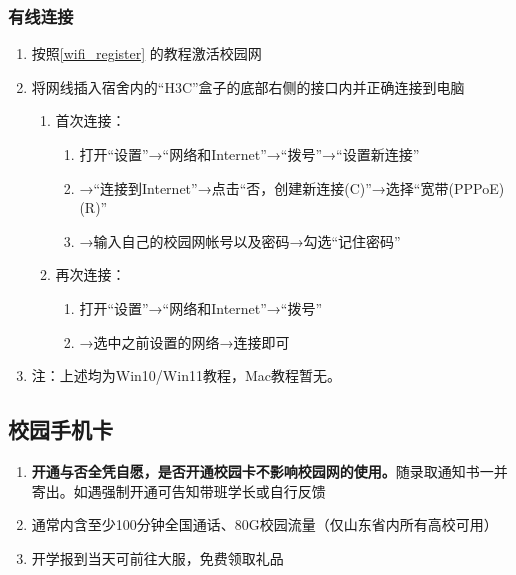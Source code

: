 \subsubsection[有线连接]{有线连接}
\begin{enumerate}
    \item 按照\uline{\ref{wifi_register}} 的教程激活校园网
    \item 将网线插入宿舍内的“H3C”盒子的底部右侧的接口内并正确连接到电脑\footnotemark
          \begin{enumerate}
              \item 首次连接：
                    \begin{enumerate}
                        \item 打开“设置”→“网络和Internet”→“拨号”→“设置新连接”
                        \item →“连接到Internet”→点击“否，创建新连接(C)”→选择“宽带(PPPoE)(R)”
                        \item →输入自己的校园网帐号以及密码→勾选“记住密码”
                    \end{enumerate}
              \item 再次连接：
                    \begin{enumerate}
                        \item 打开“设置”→“网络和Internet”→“拨号”
                        \item →选中之前设置的网络→连接即可
                    \end{enumerate}
          \end{enumerate}
    \item  注：上述均为Win10/Win11教程，Mac教程暂无。
\end{enumerate}

\subsection[校园手机卡]{校园手机卡}
\begin{enumerate}
    \item \textbf{开通与否全凭自愿，是否开通校园卡不影响校园网的使用。}随录取通知书一并寄出。如遇强制开通可告知带班学长或自行反馈
    \item 通常内含至少100分钟全国通话、80G校园流量（仅山东省内所有高校可用）\footnotemark
    \item 开学报到当天可前往大服，免费领取礼品
\end{enumerate}

